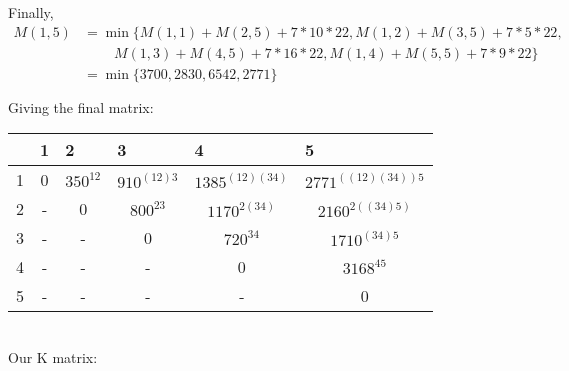 \documentclass[12pt]{article}
\begin{document}
Finally,
\begin{align*}
M(1,5) & = \min \{M(1,1) + M(2,5) + 7*10*22, M(1,2) + M(3,5) + 7*5*22,\\
            &~~~~~~~~~~  M(1,3) + M(4,5) + 7*16*22, M(1,4) + M(5,5) + 7*9*22 \}\\
            &= \min \{ 3700, 2830, 6542,2771  \}\\
\\
\end{align*}
Giving the final matrix:
\\
\begin{table}[h]
\centering
\begin{tabular}{|c|c|c|c|c|c|}
\hline
\multicolumn{1}{|l|}{} & \multicolumn{1}{|l|}{1} & \multicolumn{1}{l|}{2} & \multicolumn{1}{l|}{3} & \multicolumn{1}{l|}{4} & \multicolumn{1}{l|}{5} \\ \hline
1&0                       & $350^{12}$                     &  $910^{ (12)3}$                    &                 $1385^{(12)(34)}$      &   $2771^{ ((12)(34))5}$                \\ \hline
2&-                       & 0                     & $800^{23} $                     &   $1170^{2(34)}$                    &         $2160^{2((34)5)}$         \\ \hline
3&-                       & -                     & 0                     & $ 720^{34} $                    &  $1710^{(34)5}$                     \\ \hline
4&-                       & -                     & -                     & 0                     & $ 3168^{45}$                     \\ \hline
5&-                       & -                     & -                     & -                     &    0                   \\ \hline
\end{tabular}
\end{table}
\\
Our K matrix:\\
\end{document}

